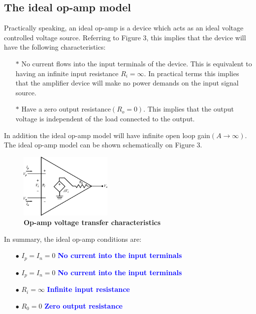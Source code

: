 \documentclass[a4 paper]{article}
\newcommand{\blue}[1]{\textcolor{blue}{#1}}
\numberwithin{equation}{section}
\newcommand{\0}{\mathbf{0}}
\begin{document}
\subsection{The ideal op-amp model}
Practically speaking, an ideal op-amp is a device which acts as an ideal voltage controlled voltage source. Referring to Figure 3, this implies that the device will have the following characteristics: 

\begin{itemize}
  \item[$\ast$] No current flows into the input terminals of the device. This is equivalent to having an infinite input resistance $R_i = \infty$. In practical terms this implies that the amplifier device will make no power demands on the input signal source.
  \item[$\ast$] Have a zero output resistance$(R_o = 0)$. This implies that the output voltage is independent of the load connected to the output.
\end{itemize}



In addition the ideal op-amp model will have infinite open loop gain$(A \rightarrow \infty)$. The ideal op-amp model can be shown schematically on Figure 3.%


\begin{figure}[!ht]
  \centering
  \label{op-amp2}
  \includegraphics[width=0.4\textwidth]{./images/circuit2/circuit_append1}
  \caption{{\bf Op-amp voltage transfer characteristics}}
\end{figure}

In summary, the ideal op-amp conditions are: 

\begin{itemize} \itemsep3pt \parskip0pt 
  \item[$\bullet$] $I_p = I_n = 0$ \hspace{8 mm}\blue{\bf No current into the input terminals}
  \item[$\bullet$] $I_p = I_n = 0$ \hspace{8 mm}\blue{\bf No current into the input terminals}
  \item[$\bullet$] $R_i = \infty$ \hspace{14 mm}\blue{\bf Infinite input resistance}
  \item[$\bullet$] $R_0 = 0$ \hspace{15 mm}\blue{\bf Zero output resistance}
\end{itemize}
\end{document}
